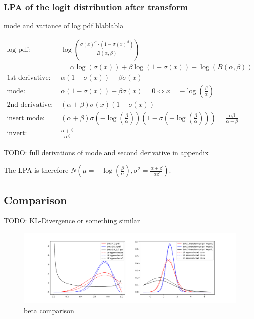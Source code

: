 \documentclass{article}
\begin{document}
\subsubsection{LPA of the logit distribution after transform}

mode and variance of log pdf blablabla

\begin{align*}
\text{log-pdf: } &\log\left( \frac{\sigma(x)^{\alpha} \cdot (1 - \sigma(x)^{\beta})}{B(\alpha, \beta)} \right) \\
&= \alpha \log(\sigma(x)) + \beta \log(1 - \sigma(x)) - \log(B(\alpha, \beta))\\
\text{1st derivative: }&  \alpha (1 - \sigma(x)) - \beta \sigma(x)\\
\text{mode: }& \alpha (1 - \sigma(x)) - \beta \sigma(x) = 0 \Leftrightarrow x = -\log(\frac{\beta}{\alpha}) \\
\text{2nd derivative: }& (\alpha + \beta)\sigma(x)(1 - \sigma(x))  \\
\text{insert mode: }& (\alpha + \beta)\sigma(-\log(\frac{\beta}{\alpha}))(1 - \sigma(-\log(\frac{\beta}{\alpha}))) = \frac{\alpha\beta}{\alpha + \beta}  \\
\text{invert: }& \frac{\alpha + \beta}{\alpha \beta}
\end{align*}

TODO: full derivations of mode and second derivative in appendix

The LPA is therefore $N(\mu=-\log(\frac{\beta}{\alpha}), \sigma^2 = \frac{\alpha + \beta}{\alpha \beta})$.

\subsection{Comparison}

TODO: KL-Divergence or something similar

\begin{figure}[!htb]
	\centering
	\includegraphics[width=\textwidth]{beta_playground.pdf}
	\caption{beta comparison}
	\label{fig:beta_comparison}
\end{figure}
\end{document}
